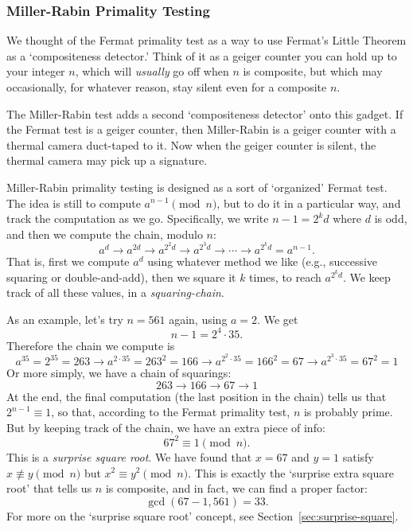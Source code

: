 \documentclass{article}
\theoremstyle{plain}
\theoremstyle{definition}
\theoremstyle{remark}
\numberwithin{theorem}{section}
\begin{document}
\subsubsection{Miller-Rabin Primality Testing}

We thought of the Fermat primality test as a way to use Fermat's Little Theorem as a `compositeness detector.'  Think of it as a geiger counter you can hold up to your integer $n$, which will \emph{usually} go off when $n$ is composite, but which may occasionally, for whatever reason, stay silent even for a composite $n$.

The Miller-Rabin test adds a second `compositeness detector' onto this gadget.  If the Fermat test is a geiger counter, then Miller-Rabin is a geiger counter with a thermal camera duct-taped to it.  Now when the geiger counter is silent, the thermal camera may pick up a signature.

Miller-Rabin primality testing is designed as a sort of `organized' Fermat test.  The idea is still to compute $a^{n-1} \pmod n$, but to do it in a particular way, and track the computation as we go.  Specifically, we write $n -1 = 2^k d$ where $d$ is odd, and then we compute the chain, modulo $n$:
\[
a^d \longrightarrow a^{2d} \longrightarrow a^{2^2d} \longrightarrow a^{2^3d} \longrightarrow \cdots \longrightarrow a^{2^k d} = a^{n-1}.
\]
That is, first we compute $a^d$ using whatever method we like (e.g., successive squaring or double-and-add), then we square it $k$ times, to reach $a^{2^kd}$.  We keep track of all these values, in a \emph{squaring-chain}.

As an example, let's try $n=561$ again, using $a=2$.  We get
\[
n -1 = 2^4 \cdot 35.
\]
Therefore the chain we compute is
\[
a^{35} = 2^{35} = 263 \longrightarrow
a^{2 \cdot 35} = 263^2 = 166 \longrightarrow
a^{2^2 \cdot 35} = 166^2 = 67 \longrightarrow
a^{2^3 \cdot 35} = 67^2 = 1
\]
Or more simply, we have a chain of squarings:
\[
 263 \longrightarrow
166 \longrightarrow
 67 \longrightarrow
 1
\]
At the end, the final computation (the last position in the chain) tells us that $2^{n-1} \equiv 1$, so that, according to the Fermat primality test, $n$ is probably prime.  But by keeping track of the chain, we have an extra piece of info:
\[
67^2 \equiv 1 \pmod{n}.
\]
This is a \emph{surprise square root}.  We have found that $x=67$ and $y=1$ satisfy $x \not\equiv y \pmod{n}$ but $x^2 \equiv y^2 \pmod{n}$.  This is exactly the `surprise extra square root' that tells us $n$ is composite, and in fact, we can find a proper factor:
\[
\gcd(67-1,561) = 33.
\]
For more on the `surprise square root' concept, see Section~\ref{sec:surprise-square}.
\end{document}
